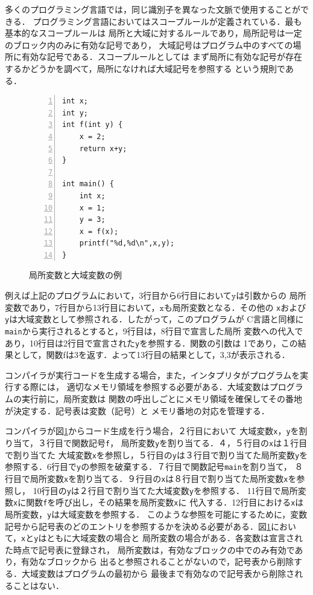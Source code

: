 \documentclass[a4j,dvipdfmx]{jbook}
\begin{document}
多くのプログラミング言語では，同じ識別子を異なった文脈で使用することができる．
プログラミング言語においてはスコープルールが定義されている．最も基本的なスコープルールは
局所と大域に対するルールであり，局所記号は一定のブロック内のみに有効な記号であり，
大域記号はプログラム中のすべての場所に有効な記号である．スコープルールとしては
まず局所に有効な記号が存在するかどうかを調べて，局所になければ大域記号を参照する
という規則である．

\begin{figure}[H]
\begin{center}
    \begin{minipage}{0.4\linewidth}
\begin{Verbatim}[frame=single,numbers=left,numberblanklines=false]
int x;
int y;
int f(int y) {
    x = 2;
    return x+y;
}

int main() {
    int x;
    x = 1;
    y = 3;
    x = f(x);
    printf("%d,%d\n",x,y);
}
\end{Verbatim}
\end{minipage}
\end{center}
\caption{局所変数と大域変数の例}\label{list:scoperule}
\end{figure}

例えば上記のプログラムにおいて，3行目から6行目において$\texttt{y}$は引数からの
局所変数であり，7行目から13行目において，$\texttt{x}$も局所変数となる．その他の
\texttt{x}および\texttt{y}は大域変数として参照される．したがって，このプログラムが
C言語と同様に\texttt{main}から実行されるとすると，9行目は，8行目で宣言した局所
変数への代入であり，10行目は2行目で宣言された\texttt{y}を参照する．関数の引数は
1であり，この結果として，関数fは3を返す．よって13行目の結果として，3,3が表示される．

コンパイラが実行コードを生成する場合，また，インタプリタがプログラムを実行する際には，
適切なメモリ領域を参照する必要がある．大域変数はプログラムの実行前に，局所変数は
関数の呼出しごとにメモリ領域を確保してその番地が決定する．記号表は変数（記号）と
メモリ番地の対応を管理する．

コンパイラが図\ref{list:scoperule}からコード生成を行う場合，２行目において
大域変数\texttt{x}，\texttt{y}を割り当て，３行目で関数記号\texttt{f}，
局所変数\texttt{y}を割り当てる．４，５行目の\texttt{x}は１行目で割り当てた
大域変数\texttt{x}を参照し，５行目の\texttt{y}は３行目で割り当てた局所変数\texttt{y}を
参照する．6行目で\texttt{y}の参照を破棄する．７行目で関数記号\texttt{main}を割り当て，
８行目で局所変数\texttt{x}を割り当てる．９行目の\texttt{x}は８行目で割り当てた局所変数\texttt{x}を参照し，
10行目の\texttt{y}は２行目で割り当てた大域変数\texttt{y}を参照する．
11行目で局所変数\texttt{x}に関数\texttt{f}を呼び出し，その結果を局所変数\texttt{x}に
代入する．12行目における\texttt{x}は局所変数，\texttt{y}は大域変数を参照する．
このような参照を可能にするために，変数記号から記号表のどのエントリを参照するかを決める必要がある．図\ref{list:scoperule}において，\texttt{x}と\texttt{y}はともに大域変数の場合と
局所変数の場合がある．各変数は宣言された時点で記号表に登録され，
局所変数は，有効なブロックの中でのみ有効であり，有効なブロックから
出ると参照されることがないので，記号表から削除する．大域変数はプログラムの最初から
最後まで有効なので記号表から削除されることはない．
\end{document}
